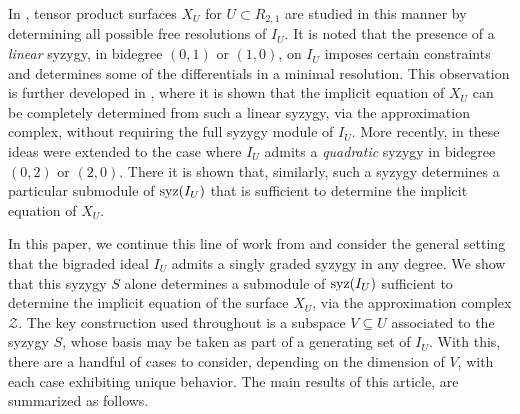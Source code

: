 \documentclass[reqno]{amsart}
\numberwithin{equation}{section}
\theoremstyle{definition}
\def\Z{\mathcal{Z}}
\def\syz{\mathop{\rm syz}}
\begin{document}
In \cite{SSV14}, tensor product surfaces $X_U$ for $U\subset R_{2,1}$ are studied in this manner by determining all possible free resolutions of $I_U$. It is noted that the presence of a \textit{linear} syzygy, in bidegree $(0,1)$ or $(1,0)$, on $I_U$  imposes certain constraints and determines some of the differentials in a minimal resolution. This observation is further developed in \cite{DS16}, where it is shown that the implicit equation of $X_U$ can be completely determined from such a linear syzygy, via the approximation complex, without requiring the full syzygy module of $I_U$. More recently, in \cite{Weaver25} these ideas were extended to the case where $I_U$ admits a \textit{quadratic} syzygy in bidegree $(0,2)$ or $(2,0)$. There it is shown that, similarly, such a syzygy determines a particular submodule of $\syz(I_U)$ that is sufficient to determine the implicit equation of $X_U$.



In this paper, we continue this line of work from \cite{DS16,Weaver25} and consider the general setting that the bigraded ideal $I_U$ admits a singly graded syzygy in any degree. We show that this syzygy $S$ alone determines a submodule of $\syz(I_U)$ sufficient to determine the implicit equation of the surface $X_U$, via the approximation complex $\Z$. The key construction used throughout is a subspace $V \subseteq U$ associated to the syzygy $S$, whose basis may be taken as part of a generating set of $I_U$. With this, there are a handful of cases to consider, depending on the dimension of $V$, with each case exhibiting unique behavior. The main results of this article, 
are summarized as follows.
\end{document}
